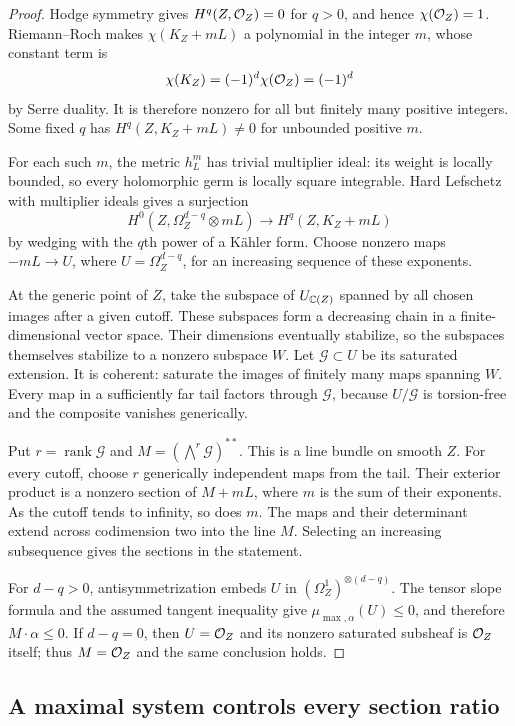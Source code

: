 \begin{proof}
Hodge symmetry gives $H^q(Z,\mathcal O_Z)=0$ for $q>0$, and hence
$\chi(\mathcal O_Z)=1$. Riemann--Roch makes $\chi(K_Z+mL)$ a polynomial
in the integer $m$, whose constant term is
\[
                  \chi(K_Z)=(-1)^d\chi(\mathcal O_Z)=(-1)^d
\]
by Serre duality. It is therefore nonzero for all but finitely many
positive integers. Some fixed $q$ has $H^q(Z,K_Z+mL)\ne0$ for
unbounded positive $m$.

For each such $m$, the metric $h_L^m$ has trivial multiplier ideal:
its weight is locally bounded, so every holomorphic germ is locally
square integrable. Hard Lefschetz with multiplier ideals
\cite[Theorem~2.1.1]{DPS2001} gives a surjection
\[
 H^0(Z,\Omega_Z^{d-q}\otimes mL)
       \longrightarrow H^q(Z,K_Z+mL)
\]
by wedging with the $q$th power of a K\"ahler form. Choose nonzero
maps $-mL\to U$, where $U=\Omega_Z^{d-q}$, for an increasing
sequence of these exponents.

At the generic point of $Z$, take the subspace of $U_{\mathbb C(Z)}$
spanned by all chosen images after a given cutoff. These subspaces
form a decreasing chain in a finite-dimensional vector space. Their
dimensions eventually stabilize, so the subspaces themselves stabilize
to a nonzero subspace $W$. Let $\mathcal G\subset U$ be its saturated
extension. It is coherent: saturate the images of finitely many maps
spanning $W$. Every map in a sufficiently far tail factors through
$\mathcal G$, because $U/\mathcal G$ is torsion-free and the
composite vanishes generically.

Put $r=\operatorname{rank}\mathcal G$ and
$M=(\bigwedge^r\mathcal G)^{**}$. This is a line bundle on smooth
$Z$. For every cutoff, choose $r$ generically independent maps from
the tail. Their exterior product is a nonzero section of $M+mL$,
where $m$ is the sum of their exponents. As the cutoff tends to
infinity, so does $m$. The maps and their determinant extend across
codimension two into the line $M$. Selecting an increasing subsequence
gives the sections in the statement.

For $d-q>0$, antisymmetrization embeds $U$ in
$(\Omega_Z^1)^{\otimes(d-q)}$. The tensor slope formula and the
assumed tangent inequality give $\mu_{\max,\alpha}(U)\le0$,
and therefore $M\cdot\alpha\le0$. If $d-q=0$, then
$U=\mathcal O_Z$ and its nonzero saturated subsheaf is $\mathcal O_Z$ itself;
thus $M=\mathcal O_Z$ and the same conclusion holds.
\end{proof}

\subsection{A maximal system controls every section ratio}

